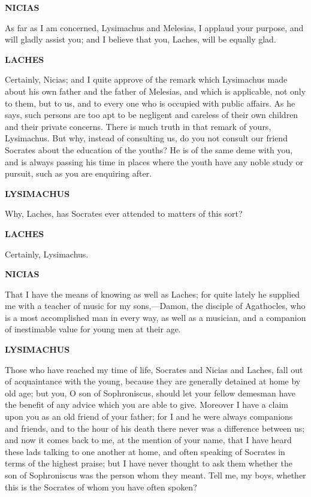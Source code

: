 \documentclass[11pt,letter]{article}
\begin{document}
\par \textbf{NICIAS}
\par   As far as I am concerned, Lysimachus and Melesias, I applaud your purpose, and will gladly assist you; and I believe that you, Laches, will be equally glad.

\par \textbf{LACHES}
\par   Certainly, Nicias; and I quite approve of the remark which Lysimachus made about his own father and the father of Melesias, and which is applicable, not only to them, but to us, and to every one who is occupied with public affairs. As he says, such persons are too apt to be negligent and careless of their own children and their private concerns. There is much truth in that remark of yours, Lysimachus. But why, instead of consulting us, do you not consult our friend Socrates about the education of the youths? He is of the same deme with you, and is always passing his time in places where the youth have any noble study or pursuit, such as you are enquiring after.

\par \textbf{LYSIMACHUS}
\par   Why, Laches, has Socrates ever attended to matters of this sort?

\par \textbf{LACHES}
\par   Certainly, Lysimachus.

\par \textbf{NICIAS}
\par   That I have the means of knowing as well as Laches; for quite lately he supplied me with a teacher of music for my sons,—Damon, the disciple of Agathocles, who is a most accomplished man in every way, as well as a musician, and a companion of inestimable value for young men at their age.

\par \textbf{LYSIMACHUS}
\par   Those who have reached my time of life, Socrates and Nicias and Laches, fall out of acquaintance with the young, because they are generally detained at home by old age; but you, O son of Sophroniscus, should let your fellow demesman have the benefit of any advice which you are able to give. Moreover I have a claim upon you as an old friend of your father; for I and he were always companions and friends, and to the hour of his death there never was a difference between us; and now it comes back to me, at the mention of your name, that I have heard these lads talking to one another at home, and often speaking of Socrates in terms of the highest praise; but I have never thought to ask them whether the son of Sophroniscus was the person whom they meant. Tell me, my boys, whether this is the Socrates of whom you have often spoken?
\end{document}
